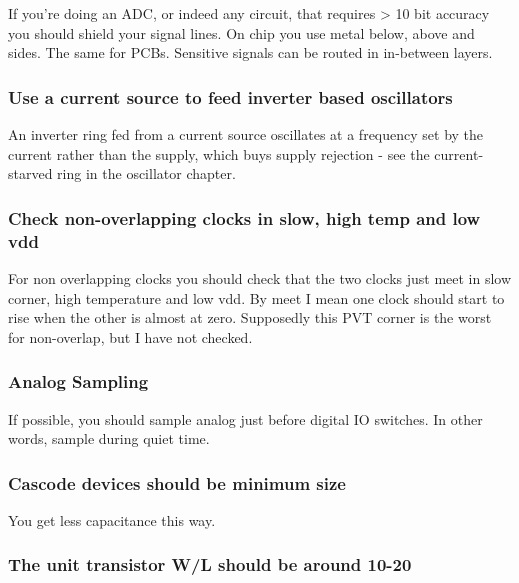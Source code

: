 If you're doing an ADC, or indeed any circuit, that requires
\textgreater{} 10 bit accuracy you should shield your signal lines. On
chip you use metal below, above and sides. The same for PCBs. Sensitive
signals can be routed in in-between layers.

\subsubsection{Use a current source to feed inverter based
oscillators}\label{use-a-current-source-to-feed-inverter-based-oscillators}

An inverter ring fed from a current source oscillates at a frequency set
by the current rather than the supply, which buys supply rejection - see
the current-starved ring in the oscillator chapter.

\subsubsection{Check non-overlapping clocks in slow, high temp and low
vdd}\label{check-non-overlapping-clocks-in-slow-high-temp-and-low-vdd}

For non overlapping clocks you should check that the two clocks just
meet in slow corner, high temperature and low vdd. By meet I mean one
clock should start to rise when the other is almost at zero. Supposedly
this PVT corner is the worst for non-overlap, but I have not checked.

\subsubsection{Analog Sampling}\label{analog-sampling}

If possible, you should sample analog just before digital IO switches.
In other words, sample during quiet time.

\subsubsection{Cascode devices should be minimum
size}\label{cascode-devices-should-be-minimum-size}

You get less capacitance this way.

\subsubsection{The unit transistor W/L should be around
10-20}\label{the-unit-transistor-wl-should-be-around-10-20}

